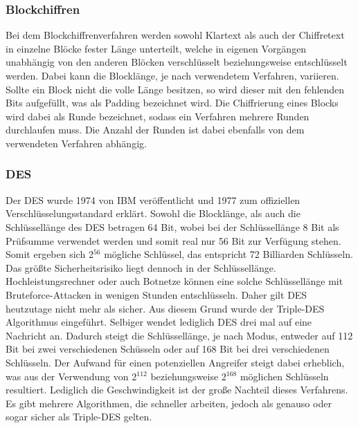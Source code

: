 \subsubsection{Blockchiffren}
\label{blockchiffren}
Bei dem Blockchiffrenverfahren werden sowohl Klartext als auch der Chiffretext in einzelne Blöcke fester Länge unterteilt, welche in eigenen Vorgängen unabhängig von den anderen Blöcken verschlüsselt beziehungsweise entschlüsselt werden\cite[vgl.][Seite 72]{ling02}.
Dabei kann die Blocklänge, je nach verwendetem Verfahren, variieren\cite[vgl.][Seite 72]{ling02}.
Sollte ein Block nicht die volle Länge besitzen, so wird dieser mit den fehlenden Bits aufgefüllt, was als Padding bezeichnet wird\cite[vgl.][Seite 72]{ling02}.
Die Chiffrierung eines Blocks wird dabei als Runde bezeichnet, sodass ein Verfahren mehrere Runden durchlaufen muss.
Die Anzahl der Runden ist dabei ebenfalls von dem verwendeten Verfahren abhängig.

\subsubsection{DES}
\label{des}
Der \ac{DES} wurde 1974 von IBM veröffentlicht und 1977 zum offiziellen Verschlüsselungsstandard erklärt.
Sowohl die Blocklänge, als auch die Schlüssellänge des \ac{DES} betragen 64 Bit, wobei bei der Schlüssellänge 8 Bit als Prüfsumme verwendet werden und somit real nur 56 Bit zur Verfügung stehen\cite[vgl.][Seite 78]{ling02}.
Somit ergeben sich 2$^{56}$ mögliche Schlüssel, das entspricht 72 Billiarden Schlüsseln\cite[vgl.][Seite 80]{ling02}.
Das größte Sicherheitsrisiko liegt dennoch in der Schlüssellänge.
Hochleistungsrechner oder auch Botnetze können eine solche Schlüssellänge mit Bruteforce-Attacken in wenigen Stunden entschlüsseln\cite[vgl.][Seite 80]{ling02}.
Daher gilt \ac{DES} heutzutage nicht mehr als sicher.
Aus diesem Grund wurde der Triple-\ac{DES} Algorithmus eingeführt.
Selbiger wendet lediglich \ac{DES} drei mal auf eine Nachricht an\cite[vgl.][Seite 82]{ling02}.
Dadurch steigt die Schlüssellänge, je nach Modus, entweder auf 112 Bit bei zwei verschiedenen Schüsseln oder auf 168 Bit bei drei verschiedenen Schlüsseln\cite[vgl.][Seite 82]{ling02}.
Der Aufwand für einen potenziellen Angreifer steigt dabei erheblich, was aus der Verwendung von 2$^{112}$ beziehungsweise 2$^{168}$ möglichen Schlüsseln resultiert\cite[vgl.][Seite 82]{ling02}.
Lediglich die Geschwindigkeit ist der große Nachteil dieses Verfahrens.
Es gibt mehrere Algorithmen, die schneller arbeiten, jedoch als genauso oder sogar sicher als Triple-\ac{DES} gelten.

